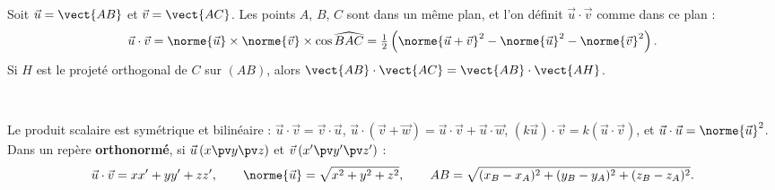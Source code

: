 \noindent
\begin{minipage}[c]{0.58\linewidth}
\begin{definition}
\raggedright
Soit $\vec u=\vect{AB}$ et $\vec v=\vect{AC}$. Les points $A$, $B$, $C$ sont dans un même plan, et l'on définit $\vec u\cdot\vec v$
comme dans ce plan :
\[\vec u\cdot\vec v=\norme{\vec u}\times\norme{\vec v}\times\cos\widehat{BAC}=\tfrac12\left(\norme{\vec u+\vec v}^2-\norme{\vec u}^2-\norme{\vec v}^2\right).\]
Si $H$ est le projeté orthogonal de $C$ sur $(AB)$, alors $\vect{AB}\cdot\vect{AC}=\vect{AB}\cdot\vect{AH}$.
\end{definition}
\end{minipage}\hfill
\begin{minipage}[c]{0.38\linewidth}
\centering
{}\\[0.5mm]
\end{minipage}

\begin{propriete}
Le produit scalaire est symétrique et bilinéaire : $\vec u\cdot\vec v=\vec v\cdot\vec u$,
$\vec u\cdot(\vec v+\vec w)=\vec u\cdot\vec v+\vec u\cdot\vec w$, $(k\vec u)\cdot\vec v=k(\vec u\cdot\vec v)$, et
$\vec u\cdot\vec u=\norme{\vec u}^2$. Dans un repère \textbf{orthonormé}, si $\vec u\,(x\pv y\pv z)$ et $\vec v\,(x'\pv y'\pv z')$ :
\[\vec u\cdot\vec v=xx'+yy'+zz',\qquad \norme{\vec u}=\sqrt{x^2+y^2+z^2},\qquad
AB=\sqrt{(x_B-x_A)^2+(y_B-y_A)^2+(z_B-z_A)^2}.\]
\end{propriete}


